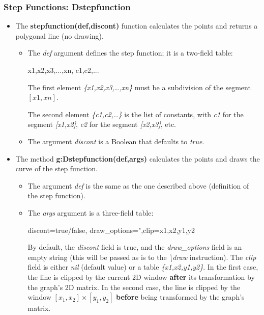 \subsubsection{Step Functions: Dstepfunction}

\begin{itemize}
    \item The \textbf{stepfunction(def,discont)} function calculates the points and returns a polygonal line (no drawing).

\begin{itemize}
    \item The \emph{def} argument defines the step function; it is a two-field table:

\begin{TeXcode}
{ {x1,x2,x3,...,xn}, {c1,c2,...} }
\end{TeXcode}

The first element \emph{\{x1,x2,x3,\ldots,xn\}} must be a subdivision of the segment \([x1,xn]\).

The second element \emph{\{c1,c2,\ldots\}} is the list of constants, with \emph{c1} for the segment \emph{{[}x1,x2{]}}, \emph{c2} for the segment \emph{{[}x2,x3{]}}, etc.

    \item The argument \emph{discont} is a Boolean that defaults to \emph{true}.
\end{itemize}

    \item The method \textbf{g:Dstepfunction(def,args)} calculates the points and draws the curve of the step function.

\begin{itemize}
    \item The argument \emph{def} is the same as the one described above (definition of the step function).     \item The \emph{args} argument is a three-field table:

\begin{TeXcode}
{ discont=true/false, draw_options=",clip={x1,x2,y1,y2} }
\end{TeXcode}

By default, the \emph{discont} field is true, and the \emph{draw\_options} field is an empty string (this will be passed as is to the \emph{\textbackslash draw} instruction). The \emph{clip} field is either \emph{nil} (default value) or a table \emph{\{x1,x2,y1,y2\}}. In the first case, the line is clipped by the current 2D window \textbf{after} its transformation by the graph's 2D matrix. In the second case, the line is clipped by the window $[x_1,x_2]\times[y_1,y_2]$ \textbf{before} being transformed by the graph's matrix.

\end{itemize}
\end{itemize}


